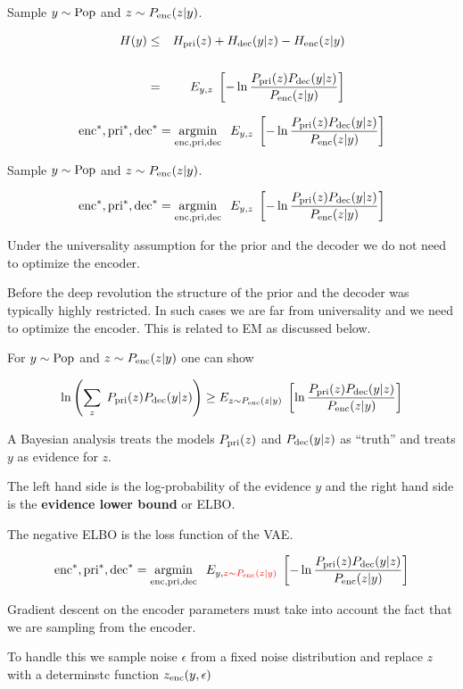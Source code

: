{
Sample $y \sim \mathrm{Pop}$ and $z \sim P_{\mathrm{enc}}(z|y)$.

\vfill
\begin{eqnarray*}
H(y) & \leq & H_{\mathrm{pri}}(z) + H_{\mathrm{dec}}(y|z) - H_{\mathrm{enc}}(z|y) \\
\\
 & = & E_{y,z}\;\left[- \ln \frac{P_{\mathrm{pri}}(z)P_{\mathrm{dec}}(y|z)}{P_{\mathrm{enc}}(z|y)}\right]
\end{eqnarray*}

\vfill
$$\mathrm{enc}^*,\mathrm{pri}^*,\mathrm{dec}^* = \operatorname*{argmin}_{\mathrm{enc},\mathrm{pri},\mathrm{dec}}\;\;E_{y,z}\;\left[- \ln \frac{P_{\mathrm{pri}}(z)P_{\mathrm{dec}}(y|z)}{P_{\mathrm{enc}}(z|y)}\right]$$


Sample $y \sim \mathrm{Pop}$ and $z \sim P_{\mathrm{enc}}(z|y)$.

\vfill
$$\mathrm{enc}^*,\mathrm{pri}^*,\mathrm{dec}^* = \operatorname*{argmin}_{\mathrm{enc},\mathrm{pri},\mathrm{dec}}\;\;E_{y,z}\;\left[- \ln \frac{P_{\mathrm{pri}}(z)P_{\mathrm{dec}}(y|z)}{P_{\mathrm{enc}}(z|y)}\right]$$

\vfill
Under the universality assumption for the prior and the decoder we do not need to optimize the encoder.

\vfill
Before the deep revolution the structure of the prior and the decoder was typically highly restricted.
In such cases we are far from universality and we need to optimize the encoder.  This is related to EM  as discussed below.


For $y \sim \mathrm{Pop}$ and $z \sim P_{\mathrm{enc}}(z|y)$ one can show

$$\ln\left(\sum_z\;P_{\mathrm{pri}}(z)P_{\mathrm{dec}}(y|z)\right) \geq E_{z\sim P_{\mathrm{enc}}(z|y)}\;\left[\ln \frac{P_{\mathrm{pri}}(z)P_{\mathrm{dec}}(y|z)}{P_{\mathrm{enc}}(z|y)}\right]$$

\vfill
A Bayesian analysis treats the models $P_{\mathrm{pri}}(z)$ and $P_{\mathrm{dec}}(y|z)$ as ``truth'' and treats $y$ as evidence for $z$.

\vfill
The left hand side is the log-probability of the evidence $y$ and the right hand side is the {\bf evidence lower bound} or ELBO.

\vfill
The negative ELBO is the loss function of the VAE.


$$\mathrm{enc}^*,\mathrm{pri}^*,\mathrm{dec}^* = \operatorname*{argmin}_{\mathrm{enc},\mathrm{pri},\mathrm{dec}}\;\;E_{y,{\color{red} z\sim P_{\mathrm{enc}}(z|y)}}\;\left[- \ln \frac{P_{\mathrm{pri}}(z)P_{\mathrm{dec}}(y|z)}{P_{\mathrm{enc}}(z|y)}\right]$$

\vfill
Gradient descent on the encoder parameters must take into account the fact that we are sampling from the encoder.

\vfill
To handle this we sample noise $\epsilon$ from a fixed noise distribution and replace $z$ with a determinstc function $z_{\mathrm{enc}}(y,\epsilon)$

}
